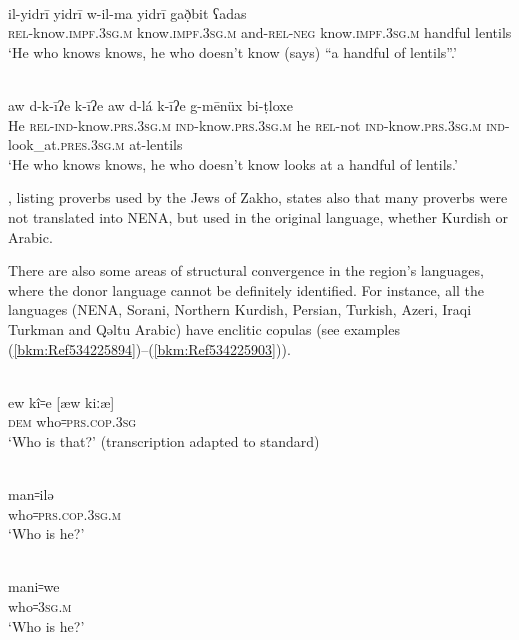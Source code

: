 \documentclass[output=paper]{langsci/langscibook}
\begin{document}
\ea\label{ex:coghill:}
\\
\gll il-yidrī   yidrī     w-il-ma yidrī     gað̣bit ʕadas\\
    \textsc{rel}\textup{{}-know.}\textsc{impf.3sg.m} \textup{know.}\textsc{impf.3sg.m} \textup{and-}\textsc{rel}\textup{{}-}\textsc{neg} \textup{know.}\textsc{impf.3sg.m} \textup{handful lentils}\\
\glt ‘He who knows knows, he who doesn’t know (says) “a handful of lentils”.’\z

\ea\label{ex:coghill:}
\\
\gll aw d-k-īʔe   k-īʔe     aw d-lá k-īʔe   g-mēnüx bi-ṭloxe\\
    \textup{He} \textsc{rel}\textup{{}-}\textsc{ind-}\textup{know}\textsc{.prs.3sg.m} \textsc{ind}\textup{{}-know.}\textsc{prs.3sg.m} \textup{he} \textsc{rel}\textup{{}-not} \textsc{ind}\textup{{}-know.}\textsc{prs.3sg.m} \textsc{ind-}\textup{look\_at.}\textsc{pres}.\textsc{3sg.m} \textup{at-lentils}\\
\glt ‘He who knows knows, he who doesn’t know looks at a handful of lentils.’\z

\citet{Sabar1978}, listing proverbs used by the Jews of Zakho, states also that many proverbs were not translated into NENA, but used in the original language, whether Kurdish or Arabic.

There are also some areas of structural convergence in the region’s languages, where the donor language cannot be definitely identified. For instance, all the languages (NENA, Sorani, Northern Kurdish, Persian, Turkish, Azeri, Iraqi Turkman and Qəltu Arabic) have enclitic copulas (see examples (\ref{bkm:Ref534225894})–(\ref{bkm:Ref534225903})).

\ea\label{ex:coghill:}
\\
\gll ew kî꞊e \textup{[æw kiːæ]}\\
     \textsc{dem} who꞊\textsc{prs.cop.3sg}\\
\glt ‘Who is that?’ (transcription adapted to standard)\z

\ea\label{ex:coghill:}
\\
\gll man꞊ilə\\
     who꞊\textsc{prs.cop.3sg.m}\\
\glt ‘Who is he?’\z

\ea\label{ex:coghill:}
 \\
\gll mani꞊we\\
     who꞊\textsc{3sg.m}\\
\glt ‘Who is he?’\z
\end{document}
